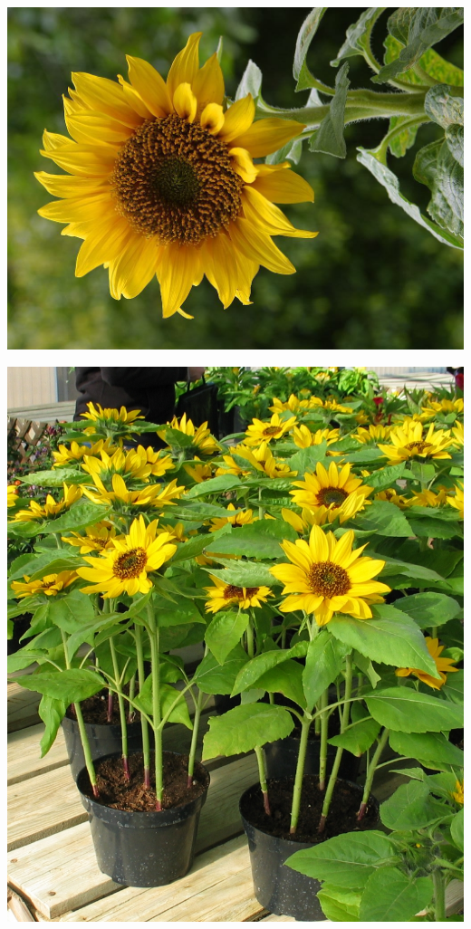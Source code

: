 \documentclass{article}
\begin{document}
\begin{center}
\includegraphics[height=0.925\paperheight]{../Sunflower.jpg}
\end{center}
\newpage

\begin{center}
\includegraphics[height=0.925\paperheight]{../Sunflower_pots.jpg}
\end{center}
\newpage
\end{document}
